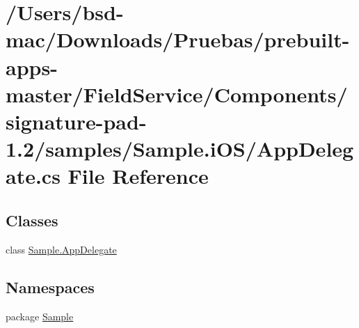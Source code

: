 \hypertarget{_components_2signature-pad-1_82_2samples_2_sample_8i_o_s_2_app_delegate_8cs}{\section{/\+Users/bsd-\/mac/\+Downloads/\+Pruebas/prebuilt-\/apps-\/master/\+Field\+Service/\+Components/signature-\/pad-\/1.2/samples/\+Sample.i\+O\+S/\+App\+Delegate.cs File Reference}
\label{_components_2signature-pad-1_82_2samples_2_sample_8i_o_s_2_app_delegate_8cs}
}
\subsection*{Classes}
\begin{DoxyCompactItemize}
\item 
class \hyperlink{class_sample_1_1_app_delegate}{Sample.\+App\+Delegate}
\end{DoxyCompactItemize}
\subsection*{Namespaces}
\begin{DoxyCompactItemize}
\item 
package \hyperlink{namespace_sample}{Sample}
\end{DoxyCompactItemize}
